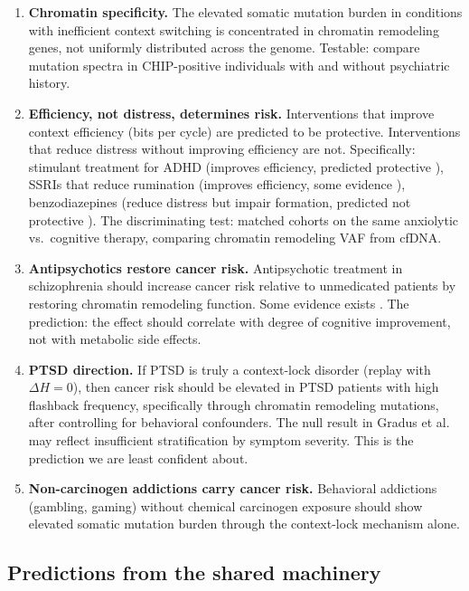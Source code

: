 \documentclass[11pt]{article}
\theoremstyle{definition}
\begin{document}
\begin{enumerate}
\item \textbf{Chromatin specificity.} The elevated somatic
mutation burden in conditions with inefficient context switching
is concentrated in chromatin remodeling genes, not uniformly
distributed across the genome. Testable: compare mutation spectra
in CHIP-positive individuals with and without psychiatric history.

\item \textbf{Efficiency, not distress, determines risk.}
Interventions that improve context efficiency (bits per cycle)
are predicted to be protective. Interventions that reduce distress
without improving efficiency are not. Specifically:
stimulant treatment for ADHD (improves efficiency, predicted
protective \cite{Dalsgaard2018}), SSRIs that reduce rumination
(improves efficiency, some evidence \cite{Chubak2011}),
benzodiazepines (reduce distress but impair formation, predicted
not protective \cite{Kao2017}). The discriminating test:
matched cohorts on the same anxiolytic vs.\ cognitive therapy,
comparing chromatin remodeling VAF from cfDNA.

\item \textbf{Antipsychotics restore cancer risk.} Antipsychotic
treatment in schizophrenia should increase cancer risk relative to
unmedicated patients by restoring chromatin remodeling function.
Some evidence exists \cite{Solmi2020}. The prediction: the effect
should correlate with degree of cognitive improvement, not with
metabolic side effects.

\item \textbf{PTSD direction.} If PTSD is truly a context-lock
disorder (replay with $\Delta H = 0$), then cancer risk should be
elevated in PTSD patients with high flashback frequency,
specifically through chromatin remodeling mutations, after
controlling for behavioral confounders. The null result in
Gradus et al.\ \cite{Gradus2015} may reflect insufficient
stratification by symptom severity. This is the prediction we
are least confident about.

\item \textbf{Non-carcinogen addictions carry cancer risk.}
Behavioral addictions (gambling, gaming) without chemical
carcinogen exposure should show elevated somatic mutation burden
through the context-lock mechanism alone.
\end{enumerate}

\subsection{Predictions from the shared machinery}
\end{document}
